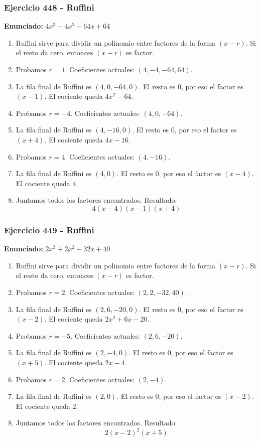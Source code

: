 \documentclass[11pt,a4paper]{article}
\begin{document}
\subsubsection*{Ejercicio 448 - Ruffini}
\textbf{Enunciado:} $ 4 x^{3} - 4 x^{2} - 64 x + 64 $\par
\begin{enumerate}[leftmargin=2em]
\item Ruffini sirve para dividir un polinomio entre factores de la forma \((x-r)\). Si el resto da cero, entonces \((x-r)\) es factor.
\item Probamos \(r=1\). Coeficientes actuales: \((4, -4, -64, 64)\).
\item La fila final de Ruffini es \((4, 0, -64, 0)\). El resto es \(0\), por eso el factor es \((x-1)\). El cociente queda \(4 x^{2} - 64\).
\item Probamos \(r=-4\). Coeficientes actuales: \((4, 0, -64)\).
\item La fila final de Ruffini es \((4, -16, 0)\). El resto es \(0\), por eso el factor es \((x+4)\). El cociente queda \(4 x - 16\).
\item Probamos \(r=4\). Coeficientes actuales: \((4, -16)\).
\item La fila final de Ruffini es \((4, 0)\). El resto es \(0\), por eso el factor es \((x-4)\). El cociente queda \(4\).
\item Juntamos todos los factores encontrados. Resultado: \[\boxed{4 \left(x - 4\right) \left(x - 1\right) \left(x + 4\right)}\]
\end{enumerate}

\vspace{0.2cm}
\subsubsection*{Ejercicio 449 - Ruffini}
\textbf{Enunciado:} $ 2 x^{3} + 2 x^{2} - 32 x + 40 $\par
\begin{enumerate}[leftmargin=2em]
\item Ruffini sirve para dividir un polinomio entre factores de la forma \((x-r)\). Si el resto da cero, entonces \((x-r)\) es factor.
\item Probamos \(r=2\). Coeficientes actuales: \((2, 2, -32, 40)\).
\item La fila final de Ruffini es \((2, 6, -20, 0)\). El resto es \(0\), por eso el factor es \((x-2)\). El cociente queda \(2 x^{2} + 6 x - 20\).
\item Probamos \(r=-5\). Coeficientes actuales: \((2, 6, -20)\).
\item La fila final de Ruffini es \((2, -4, 0)\). El resto es \(0\), por eso el factor es \((x+5)\). El cociente queda \(2 x - 4\).
\item Probamos \(r=2\). Coeficientes actuales: \((2, -4)\).
\item La fila final de Ruffini es \((2, 0)\). El resto es \(0\), por eso el factor es \((x-2)\). El cociente queda \(2\).
\item Juntamos todos los factores encontrados. Resultado: \[\boxed{2 \left(x - 2\right)^{2} \left(x + 5\right)}\]
\end{enumerate}
\end{document}
